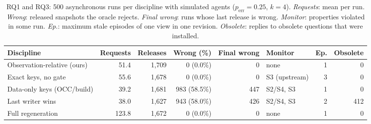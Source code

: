 \documentclass[pdflatex,sn-mathphys-num]{sn-jnl}
\theoremstyle{thmstyleone}%
\theoremstyle{thmstyletwo}%
\theoremstyle{thmstylethree}%
\newcommand{\SimRuns}{500}
\newcommand{\SimPerr}{0.25}
\newcommand{\SimBudget}{4}
\begin{document}
\begin{table}[!ht]
\caption{RQ1 and RQ3: \SimRuns{} asynchronous runs per discipline with simulated agents ($p_{\mathrm{err}}=\SimPerr$, $k=\SimBudget$). \emph{Requests}: mean per run. \emph{Wrong}: released snapshots the oracle rejects. \emph{Final wrong}: runs whose last release is wrong. \emph{Monitor}: properties violated in some run. \emph{Ep.}: maximum stale episodes of one view in one revision. \emph{Obsolete}: replies to obsolete questions that were installed.}\label{tab:sim}
\footnotesize\setlength{\tabcolsep}{2.2pt}
\begin{tabular}{@{}lrrrrlrr@{}}\toprule
Discipline & Requests & Releases & Wrong (\%) & Final wrong & Monitor & Ep. & Obsolete\\\midrule
Observation-relative (ours) & 51.4 & 1,709 & 0 (0.0\%) & 0 & none & 1 & 0 \\
Exact keys, no gate & 55.6 & 1,678 & 0 (0.0\%) & 0 & S3 (upstream) & 3 & 0 \\
Data-only keys (OCC/build) & 39.2 & 1,681 & 983 (58.5\%) & 447 & S2/S4, S3 & 1 & 0 \\
Last writer wins & 38.0 & 1,627 & 943 (58.0\%) & 426 & S2/S4, S3 & 2 & 412 \\
Full regeneration & 123.8 & 1,672 & 0 (0.0\%) & 0 & none & 1 & 0 \\
\bottomrule
\end{tabular}
\end{table}
\end{document}
